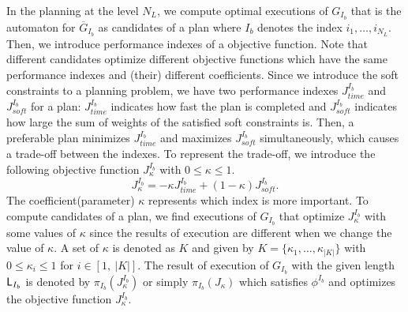 \documentclass{article}
\newcommand{\Len}{{\sf L}}
\begin{document}
In the planning at the level $N_L$, we compute optimal  executions of $G_{I_b}$ that is the automaton for $\overline{G}_{I_b}$ as candidates of a plan where $I_b$ denotes the index $i_1,\ldots,i_{N_L}$.
Then, we introduce performance indexes of a objective function.
Note that different candidates optimize different objective functions which have the same performance indexes and (their) different coefficients.
%
Since we introduce the soft constraints to a planning problem, we have two performance indexes $J_{time}^{I_b}$ and $J_{soft}^{I_b}$ for a plan: $J_{time}^{I_b}$ indicates how fast the plan is completed and $J_{soft}^{I_b}$ indicates how large the sum of weights of the satisfied soft constraints is.
Then, a preferable plan minimizes $J_{time}^{I_b}$ and maximizes $J_{soft}^{I_b}$ simultaneously, which causes a trade-off between the indexes. 
To represent the trade-off, we introduce the following objective function $J_{\kappa}^{I_b}$ with $0 \leq \kappa \leq 1$.
\begin{equation}
J_{\kappa}^{I_b}=-\kappa J_{time}^{I_b} + (1-\kappa) J_{soft}^{I_b}.
\end{equation}
The coefficient(parameter) $\kappa$ represents which index is more important.
%
To compute candidates of a plan, we find executions of $G_{I_b}$ that optimize $J_{\kappa}^{I_b}$ with some values of $\kappa$ since the results of execution are different when we change the value of $\kappa$.
%
A set of $\kappa$ is denoted as $K$ and given by
$K=\{\kappa_1,\ldots,\kappa_{|K|}\}$ with $0\leq\kappa_i\leq 1$ for $i\in [1,~|K|]$.
%
The result of execution of $G_{I_b}$ with the given length $\Len_{I_b}$ is denoted by $\pi_{I_b}(J_\kappa^{I_b})$ or simply  $\pi_{I_b}(J_\kappa)$ which satisfies $\phi^{I_b}$ and optimizes the objective function $J_\kappa^{I_b}$.
%
\end{document}
